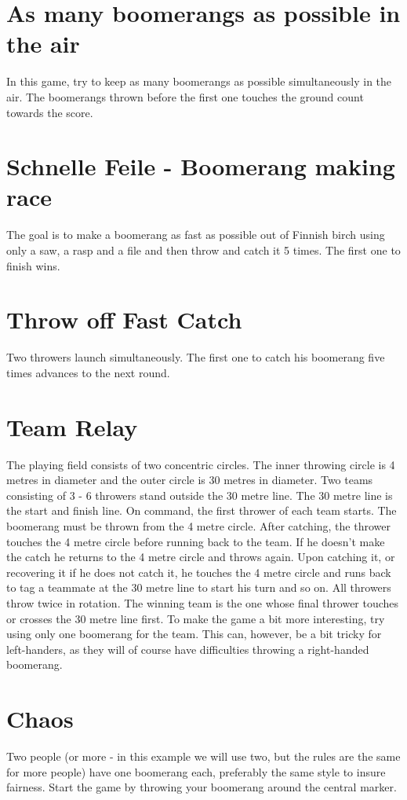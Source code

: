 \section{As many boomerangs as possible in the air}
In this game, try to keep as many boomerangs as possible simultaneously in the air. The boomerangs thrown before the first one touches the ground count towards the score.

\section{Schnelle Feile - Boomerang making race}
The goal is to make a boomerang as fast as possible out of Finnish birch using only a saw, a rasp and a file and then throw and catch it 5 times. The first one to finish wins.

\section{Throw off Fast Catch}
Two throwers launch simultaneously. The first one to catch his boomerang five times advances to the next round.
\newpage

\section{Team Relay}
The playing field consists of two concentric circles. The inner throwing circle is 4 metres in diameter and the outer circle is 30 metres in diameter. Two teams consisting of 3 - 6 throwers stand outside the 30 metre line. The 30 metre line is the start and finish line. On command, the first thrower of each team starts. The boomerang must be thrown from the 4 metre circle. After catching, the thrower touches the 4 metre circle before running back to the team. If he doesn't make the catch he returns to the 4 metre circle and throws again. Upon catching it, or recovering it if he does not catch it, he touches the 4 metre circle and runs back to tag a teammate at the 30 metre line to start his turn and so on. All throwers throw twice in rotation. The winning team is the one whose final thrower touches or crosses the 30 metre line first. 
To make the game a bit more interesting, try using only one boomerang for the team. This can, however, be a bit tricky for left-handers, as they will of course have difficulties throwing a right-handed boomerang.

\section{Chaos}
Two people (or more - in this example we will use two, but the rules are the same for more people) have one boomerang each, preferably the same style to insure fairness. Start the game by throwing your boomerang around the central marker. 

